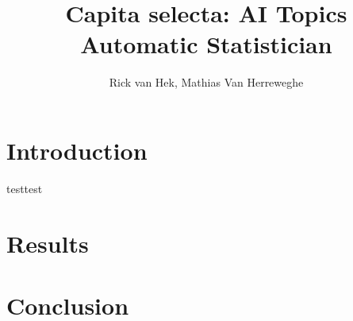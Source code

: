 \documentclass[letterpaper, 10 pt, conference]{ieeeconf}
\title{\LARGE \textbf{
Capita selecta: AI Topics} \\ Automatic Statistician 
}
\author{Rick van Hek, Mathias Van Herreweghe
}
\begin{document}
\maketitle
\thispagestyle{empty}
\pagestyle{empty}


\begin{abstract}

\begin{comment} %
In this paper I demonstrate a novel design for an optoelectronic State Machine which replaces input/output forming logic found in conventional state machines with BDD based optical logic while still using solid state memory in the form of flip-flops in order to store states. This type of logic makes use of waveguides and ring resonators to create binary switches. These switches in turn can be used to create combinational logic which can be used as input/output forming logic\cite{Killick2012} for a state machine. Replacing conventional combinational logic with BDD based optical logic allows for a faster range of state machines that can certainly outperform conventional state machines as propagation delays within the logic described are in the order of picoseconds as opposed to nanoseconds in digital logic.
\end{comment}

\end{abstract}

\tableofcontents
\section{Introduction}
\lipsum[1-2]
testtest



\section{Results}
\section{Conclusion}
\lipsum[100-101]


\addtolength{\textheight}{-12cm}  



\end{document}
